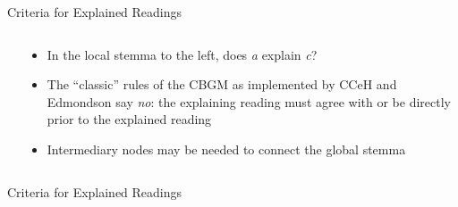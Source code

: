 \documentclass[10pt]{beamer}
\begin{document}
\begin{frame}{Criteria for Explained Readings}
\begin{columns}
\begin{column}{0.4\textwidth}
			\end{column}
			\begin{column}{0.55\textwidth}
				\begin{itemize}
					\item In the local stemma to the left, does \emph{a} explain \emph{c}?
					\item The ``classic'' rules of the CBGM as implemented by CCeH and Edmondson say \emph{no}: the explaining reading must agree with or be directly prior to the explained reading
					\item Intermediary nodes may be needed to connect the global stemma
				\end{itemize}
			\end{column}
		\end{columns}
	\end{frame}
	\begin{frame}{Criteria for Explained Readings}
		\begin{columns}
			\begin{column}{0.4\textwidth}
				\centering

\end{column}
\end{columns}
\end{frame}
\end{document}
